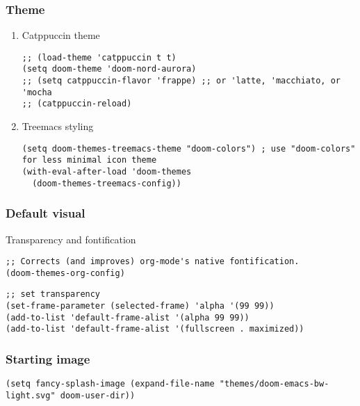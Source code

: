 \documentclass[c]{article}
\theoremstyle{plain}%
\theoremstyle{definition}
\theoremstyle{remark}
\begin{document}
\subsubsection{Theme}
\label{sec:orga23e6f5}
\begin{enumerate}
\item Catppuccin theme
\label{sec:org4b6b4d5}
\begin{verbatim}
;; (load-theme 'catppuccin t t)
(setq doom-theme 'doom-nord-aurora)
;; (setq catppuccin-flavor 'frappe) ;; or 'latte, 'macchiato, or 'mocha
;; (catppuccin-reload)
\end{verbatim}
\item Treemacs styling
\label{sec:org52cd5e5}
\begin{verbatim}
(setq doom-themes-treemacs-theme "doom-colors") ; use "doom-colors" for less minimal icon theme
(with-eval-after-load 'doom-themes
  (doom-themes-treemacs-config))
\end{verbatim}
\end{enumerate}
\subsubsection{Default visual}
\label{sec:orgcdefbc5}
Transparency and fontification
\begin{verbatim}
;; Corrects (and improves) org-mode's native fontification.
(doom-themes-org-config)
\end{verbatim}
\begin{verbatim}
;; set transparency
(set-frame-parameter (selected-frame) 'alpha '(99 99))
(add-to-list 'default-frame-alist '(alpha 99 99))
(add-to-list 'default-frame-alist '(fullscreen . maximized))
\end{verbatim}
\subsubsection{Starting image}
\label{sec:org6f9e64d}
\begin{verbatim}
(setq fancy-splash-image (expand-file-name "themes/doom-emacs-bw-light.svg" doom-user-dir))
\end{verbatim}
\end{document}
